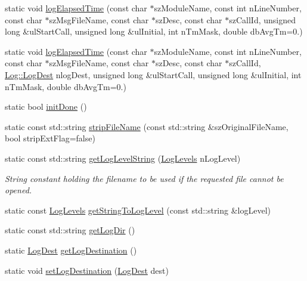 \begin{DoxyCompactItemize}
\item 
static void \hyperlink{classutils_1_1Log_a42cc9a0f0ecd76abd678ebd7ac59d8d7}{log\+Elapsed\+Time} (const char $\ast$sz\+Module\+Name, const int n\+Line\+Number, const char $\ast$sz\+Msg\+File\+Name, const char $\ast$sz\+Desc, const char $\ast$sz\+Call\+Id, unsigned long \&ul\+Start\+Call, unsigned long \&ul\+Initial, int n\+Tm\+Mask, double db\+Avg\+Tm=0.)
\item 
static void \hyperlink{classutils_1_1Log_ab7985810504b1e575a408a3fc14118d0}{log\+Elapsed\+Time} (const char $\ast$sz\+Module\+Name, const int n\+Line\+Number, const char $\ast$sz\+Msg\+File\+Name, const char $\ast$sz\+Desc, const char $\ast$sz\+Call\+Id, \hyperlink{classutils_1_1Log_aa77064096777fe92d4ff8f6d68d42d5a}{Log\+::\+Log\+Dest} nlog\+Dest, unsigned long \&ul\+Start\+Call, unsigned long \&ul\+Initial, int n\+Tm\+Mask, double db\+Avg\+Tm=0.)
\item 
static bool \hyperlink{classutils_1_1Log_a17b6d2bfbc21f2aa5af7815a1c2ca166}{init\+Done} ()
\item 
static const std\+::string \hyperlink{classutils_1_1Log_a20b001de07bd7b008126037bed0d1393}{strip\+File\+Name} (const std\+::string \&sz\+Original\+File\+Name, bool strip\+Ext\+Flag=false)
\item 
static const std\+::string \hyperlink{classutils_1_1Log_a779af049e980e1e02bc2e8b51d4557b1}{get\+Log\+Level\+String} (\hyperlink{classutils_1_1Log_a8f981afda2b7802a6e9ca4aac269d54a}{Log\+Levels} n\+Log\+Level)
\begin{DoxyCompactList}\small\item\em String constant holding the filename to be used if the requested file cannot be opened. \end{DoxyCompactList}\item 
static const \hyperlink{classutils_1_1Log_a8f981afda2b7802a6e9ca4aac269d54a}{Log\+Levels} \hyperlink{classutils_1_1Log_aa6c0a789ec50e1c59c4598e0a5436c2d}{get\+String\+To\+Log\+Level} (const std\+::string \&log\+Level)
\item 
static const std\+::string \hyperlink{classutils_1_1Log_a48fa60190dc3fea1f83fe40ff2457d93}{get\+Log\+Dir} ()
\item 
static \hyperlink{classutils_1_1Log_aa77064096777fe92d4ff8f6d68d42d5a}{Log\+Dest} \hyperlink{classutils_1_1Log_ad5953c44e5c56d1bd06597320f1ff684}{get\+Log\+Destination} ()
\item 
static void \hyperlink{classutils_1_1Log_a9bc0e1c6ce4e14943da1e94a36833b59}{set\+Log\+Destination} (\hyperlink{classutils_1_1Log_aa77064096777fe92d4ff8f6d68d42d5a}{Log\+Dest} dest)

\end{DoxyCompactItemize}
